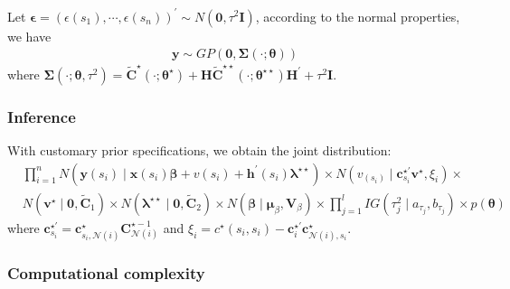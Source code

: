 \documentclass[
12pt, %
a4paper, %
oneside, %
headinclude,footinclude, %
BCOR5mm, %
]{scrartcl}
\begin{document}
Let 
$\boldsymbol{\epsilon} = \left(\epsilon(s_1), \cdots, \epsilon(s_n)\right)^\prime \sim N(\boldsymbol{0}, \tau^2\boldsymbol{I})$, according to the normal properties, we have
\begin{equation}
\begin{aligned}
\boldsymbol{y} \sim GP\left(\boldsymbol{0}, \boldsymbol{\Sigma}(\cdot; \boldsymbol{\theta})\right)
\end{aligned} \label{DP1}
\end{equation}
where $\boldsymbol{\Sigma}(\cdot; \boldsymbol{\theta}, \tau^2) = \boldsymbol{\tilde{C}}^{\star}(\cdot; \boldsymbol{\theta}^{\star}) +
\boldsymbol{H}\boldsymbol{\tilde{C}}^{\star\star}(\cdot; \boldsymbol{\theta}^{\star\star})\boldsymbol{H}^\prime + \tau^2\boldsymbol{I}.$

\subsubsection{Inference}
With customary prior specifications, we obtain the joint distribution:%
\begin{equation}
\begin{aligned}
& \prod_{i=1}^{n} N\left(\mathbf{y}\left({s}_{i}\right) \mid \mathbf{x}\left({s}_{i}\right) \boldsymbol{\beta}+
v\left(s_i\right) + \mathbf{h}^\prime(s_i)\boldsymbol{\lambda}^{\star\star}\right) \times N\left(v_{(s_i)} \mid \mathbf{c}_{s_i}^{\star\prime}\mathbf{v}^{\star}, \xi_{i}\right) \times \\ &
N\left(\mathbf{v}^{\star} \mid \boldsymbol{0}, {\tilde{\mathbf{C}}_1}\right) \times N\left(\boldsymbol{\lambda}^{\star\star} \mid \boldsymbol{0}, \tilde{\mathbf{C}}_2\right) \times N\left(\boldsymbol{\beta} \mid \boldsymbol{\mu}_{\beta}, \mathbf{V}_{\beta}\right) \times  \prod_{j=1}^{l} I G\left(\tau_{j}^{2} \mid a_{\tau_{j}}, b_{\tau_{j}}\right) \times p(\boldsymbol{\theta})
\end{aligned}
\end{equation}
where  $\mathbf{c}_{s_i}^{\star\prime} = \mathbf{c}_{s_i, \mathcal{N}(i)}^{\star}\boldsymbol{C}_{ \mathcal{N}(i)}^{\star -1}$ and $\xi_{i} = c^{\star}(s_i, s_i) - \mathbf{c}_{i}^{\star\prime} \mathbf{c}_{\mathcal{N}(i), s_i}^{\star}$.

\subsubsection{Computational complexity}
\end{document}
